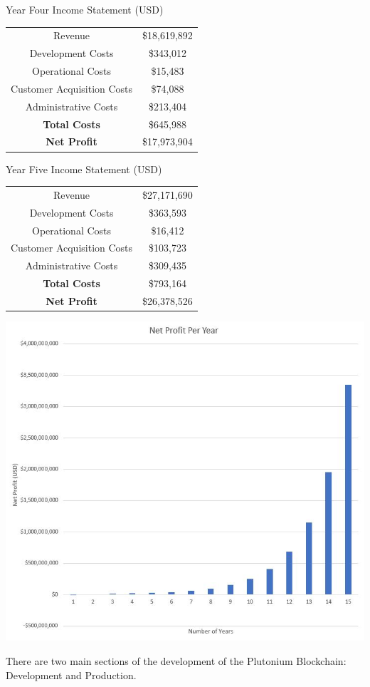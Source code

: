 \documentclass[12pt]{article}
\begin{document}
\vspace{1.5cm}
\begin{center}
	Year Four Income Statement (USD) \\[1.5ex]
	
	\begin{tabular}{c | c}
	Revenue & \$18,619,892 \\
	Development Costs & \$343,012\\
	Operational Costs & \$15,483 \\
	Customer Acquisition Costs & \$74,088 \\
	Administrative Costs & \$213,404 \\
	\textbf{Total Costs} & \$645,988 \\
	\textbf{Net Profit} & \$17,973,904
	\end{tabular}
\end{center}
\vspace{1.5cm}
\pagebreak
\begin{center}
	Year Five Income Statement (USD) \\%
	
	\begin{tabular}{c | c}
	Revenue & \$27,171,690 \\
	Development Costs & \$363,593 \\
	Operational Costs & \$16,412 \\
	Customer Acquisition Costs & \$103,723\\
	Administrative Costs & \$309,435 \\
	\textbf{Total Costs} & \$793,164 \\
	\textbf{Net Profit} & \$26,378,526
	\end{tabular}
\end{center}
\begin{center}
	\includegraphics[scale=0.75]{NetProfit}\\
\end{center}
\pagebreak
There are two main sections of the development of the Plutonium Blockchain: Development and Production. 
\end{document}

